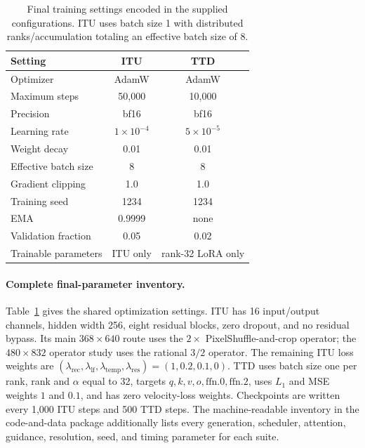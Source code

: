 \documentclass[letterpaper]{article}
\begin{document}
\begin{table}[t]
  \centering
  \small
  \setlength{\tabcolsep}{4pt}
  \begin{tabular}{lcc}
    \toprule
    Setting & ITU & TTD \\
    \midrule
    Optimizer & AdamW & AdamW \\
    Maximum steps & 50,000 & 10,000 \\
    Precision & bf16 & bf16 \\
    Learning rate & \(1{\times}10^{-4}\) & \(5{\times}10^{-5}\) \\
    Weight decay & 0.01 & 0.01 \\
    Effective batch size & 8 & 8 \\
    Gradient clipping & 1.0 & 1.0 \\
    Training seed & 1234 & 1234 \\
    EMA & 0.9999 & none \\
    Validation fraction & 0.05 & 0.02 \\
    Trainable parameters & ITU only & rank-32 LoRA only \\
    \bottomrule
  \end{tabular}
  \caption{Final training settings encoded in the supplied configurations.
  ITU uses batch size 1 with distributed ranks/accumulation totaling an
  effective batch size of 8.}
  \label{tab:training}
\end{table}

\paragraph{Complete final-parameter inventory.}
Table~\ref{tab:training} gives the shared optimization settings.  ITU has 16
input/output channels, hidden width 256, eight residual blocks, zero dropout,
and no residual bypass.  Its main \(368{\times}640\) route uses the
\(2\times\) PixelShuffle-and-crop operator; the \(480{\times}832\) operator
study uses the rational \(3/2\) operator.  The remaining ITU loss weights are
\((\lambda_{\mathrm{rec}},\lambda_{\mathrm{lf}},
\lambda_{\mathrm{temp}},\lambda_{\mathrm{res}})
=(1,0.2,0.1,0)\).  TTD uses batch size one per rank, rank and
\(\alpha\) equal to 32, targets \(q,k,v,o,\mathrm{ffn}.0,\mathrm{ffn}.2\),
uses \(L_1\) and MSE weights \(1\) and \(0.1\), and has zero velocity-loss
weights.  Checkpoints are written every 1,000 ITU steps and 500 TTD steps.
The machine-readable inventory in the code-and-data package additionally lists
every generation, scheduler, attention, guidance, resolution, seed, and timing
parameter for each suite.
\end{document}
